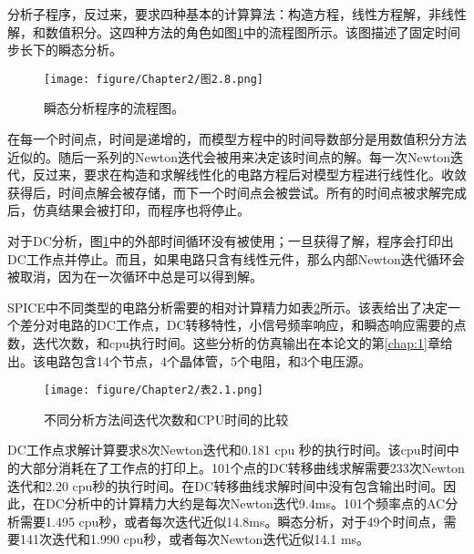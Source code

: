 分析子程序，反过来，要求四种基本的计算算法：构造方程，线性方程解，非线性解，和数值积分。这四种方法的角色如图\ref{图2.8}中的流程图所示。该图描述了固定时间步长下的瞬态分析。

\begin{figure}[htbp]
\small
    \centering
    \texttt{[image: figure/Chapter2/图2.8.png]}
    \caption{瞬态分析程序的流程图。}
    \label{图2.8}
\end{figure}

在每一个时间点，时间是递增的，而模型方程中的时间导数部分是用数值积分方法近似的。随后一系列的Newton迭代会被用来决定该时间点的解。每一次Newton迭代，反过来，要求在构造和求解线性化的电路方程后对模型方程进行线性化。收敛获得后，时间点解会被存储，而下一个时间点会被尝试。所有的时间点被求解完成后，仿真结果会被打印，而程序也将停止。

对于DC分析，图\ref{图2.8}中的外部时间循环没有被使用；一旦获得了解，程序会打印出DC工作点并停止。而且，如果电路只含有线性元件，那么内部Newton迭代循环会被取消，因为在一次循环中总是可以得到解。

SPICE中不同类型的电路分析需要的相对计算精力如表\ref{表2.1}所示。该表给出了决定一个差分对电路的DC工作点，DC转移特性，小信号频率响应，和瞬态响应需要的点数，迭代次数，和cpu执行时间。这些分析的仿真输出在本论文的第\ref{chap:1}章给出。该电路包含14个节点，4个晶体管，5个电阻，和3个电压源。

\begin{figure}[htbp]
\small
    \centering
    \texttt{[image: figure/Chapter2/表2.1.png]}
    \caption{不同分析方法间迭代次数和CPU时间的比较}
    \label{表2.1}
\end{figure}

DC工作点求解计算要求8次Newton迭代和0.181 cpu 秒的执行时间。该cpu时间中的大部分消耗在了工作点的打印上。101个点的DC转移曲线求解需要233次Newton迭代和2.20 cpu秒的执行时间。在DC转移曲线求解时间中没有包含输出时间。因此，在DC分析中的计算精力大约是每次Newton迭代9.4ms。101个频率点的AC分析需要1.495 cpu秒，或者每次迭代近似14.8ms。瞬态分析，对于49个时间点，需要141次迭代和1.990 cpu秒，或者每次Newton迭代近似14.1 ms。